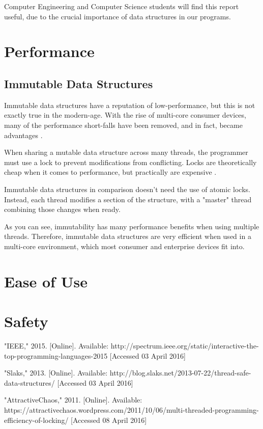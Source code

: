 \documentclass{article}
\begin{document}
Computer Engineering and Computer Science students will find this report useful,
due to the crucial importance of data structures in our programs.

\section{Performance}
\subsection{Immutable Data Structures}
Immutable data structures have a reputation of low-performance, but this is not
exactly true in the modern-age. With the rise of multi-core consumer devices,
many of the performance short-falls have been removed, and in fact, became
advantages \cite{slaks}.

When sharing a mutable data structure across many threads, the programmer must
use a lock to prevent modifications from conflicting. Locks are theoretically
cheap when it comes to performance, but practically are expensive
\cite{attractive_chaos}.

Immutable data structures in comparison doesn't need the use of atomic locks.
Instead, each thread modifies a section of the structure, with a "master"
thread combining those changes when ready.

As you can see, immutability has many performance benefits when using multiple
threads. Therefore, immutable data structures are very efficient when used in a
multi-core environment, which most consumer and enterprise devices fit into.

\section{Ease of Use}

\section{Safety}

\begin{thebibliography}{9}

  "IEEE,"
  2015.
  [Online].
  Available: http://spectrum.ieee.org/static/interactive-the-top-programming-languages-2015
  [Accessed 03 April 2016]

  "Slaks,"
  2013.
  [Online].
  Available: http://blog.slaks.net/2013-07-22/thread-safe-data-structures/
  [Accessed 03 April 2016]

  "AttractiveChaos,"
  2011.
  [Online].
  Available: https://attractivechaos.wordpress.com/2011/10/06/multi-threaded-programming-efficiency-of-locking/
  [Accessed 08 April 2016]

\end{thebibliography}
\end{document}
